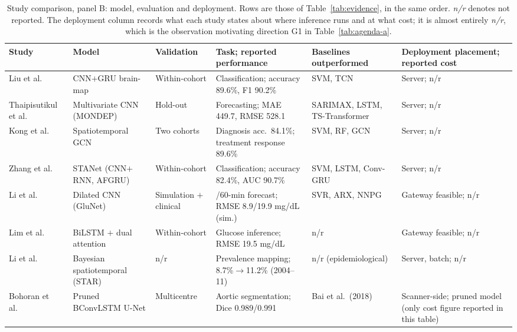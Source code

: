 \documentclass[journal]{IEEEtran}
\newif\ifsubmission
\begin{document}
\ifsubmission\else
\begin{table}[p]
\centering
\caption{Study comparison, panel B: model, evaluation and deployment. Rows are those of Table~\ref{tab:evidence}, in the same order. \emph{n/r} denotes not reported. The deployment column records what each study states about where inference runs and at what cost; it is almost entirely \emph{n/r}, which is the observation motivating direction G1 in Table~\ref{tab:agenda-a}.}
\label{tab:evidence-b}
\scriptsize
\setlength{\tabcolsep}{3pt}
\renewcommand{\arraystretch}{1.12}
\begin{tabularx}{\textwidth}{>{\raggedright\arraybackslash}p{1.9cm} >{\raggedright\arraybackslash}p{2.7cm} >{\raggedright\arraybackslash}p{1.9cm} >{\raggedright\arraybackslash}X >{\raggedright\arraybackslash}p{2.9cm} >{\raggedright\arraybackslash}p{2.9cm}}
\toprule
\textbf{Study} & \textbf{Model} & \textbf{Validation} & \textbf{Task; reported performance} & \textbf{Baselines outperformed} & \textbf{Deployment placement; reported cost} \\
\midrule
Liu et al.~\cite{2} & CNN$+$GRU brain-map & Within-cohort & Classification; accuracy 89.6\%, F1 90.2\% & SVM, TCN & Server; n/r \\
\addlinespace[1pt]
Thaipisutikul et al.~\cite{3} & Multivariate CNN (MONDEP) & Hold-out & Forecasting; MAE 449.7, RMSE 528.1 & SARIMAX, LSTM, TS-Transformer & Server; n/r \\
\addlinespace[1pt]
Kong et al.~\cite{4} & Spatiotemporal GCN & Two cohorts & Diagnosis acc.\ 84.1\%; treatment response 89.6\% & SVM, RF, GCN & Server; n/r \\
\addlinespace[1pt]
Zhang et al.~\cite{9} & STANet (CNN$+$RNN, AFGRU) & Within-cohort & Classification; accuracy 82.4\%, AUC 90.7\% & SVM, LSTM, Conv-GRU & Server; n/r \\
\addlinespace[1pt]
Li et al.~\cite{Li2020GluNet} & Dilated CNN (GluNet) & Simulation $+$ clinical & 30/60-min forecast; RMSE 8.9/19.9 mg/dL (sim.) & SVR, ARX, NNPG & Gateway feasible; n/r \\
\addlinespace[1pt]
Lim et al.~\cite{Lim2025VirtualCGM} & BiLSTM $+$ dual attention & Within-cohort & Glucose inference; RMSE 19.5 mg/dL & n/r & Gateway feasible; n/r \\
\addlinespace[1pt]
Li et al.~\cite{XiaoLi2016DiabetesSpatiotemporal} & Bayesian spatiotemporal (STAR) & n/r & Prevalence mapping; 8.7\%$\to$11.2\% (2004--11) & n/r (epidemiological) & Server, batch; n/r \\
\addlinespace[1pt]
Bohoran et al.~\cite{5} & Pruned BConvLSTM U-Net & Multicentre & Aortic segmentation; Dice 0.989/0.991 & Bai et al.\ (2018) & Scanner-side; pruned model (only cost figure reported in this table) \\

\end{tabularx}
\end{table}
\end{document}
